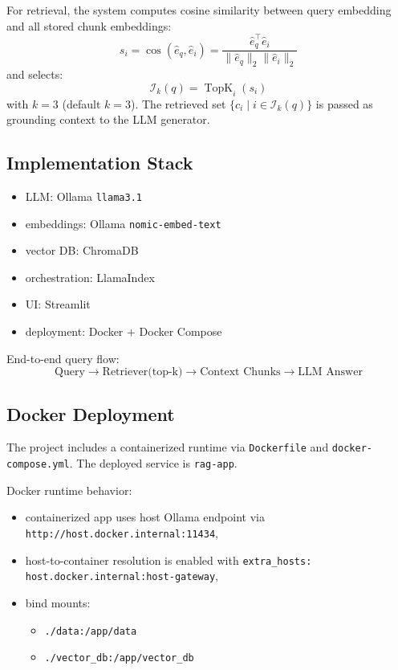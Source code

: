 \documentclass[11pt]{article}
\newcommand{\topK}{3}
\begin{document}
For retrieval, the system computes cosine similarity between query embedding and all stored chunk embeddings:
\[
s_i = \cos(\hat{e}_q, \hat{e}_i) = \frac{\hat{e}_q^\top \hat{e}_i}{\|\hat{e}_q\|_2 \|\hat{e}_i\|_2}
\]
and selects:
\[
\mathcal{I}_k(q) = \operatorname{TopK}_{i}(s_i)
\]
with \(k=\topK\) (default \(k=3\)). The retrieved set \(\{c_i \mid i \in \mathcal{I}_k(q)\}\) is passed as grounding context to the LLM generator.

\subsection{Implementation Stack}
\begin{itemize}
    \item LLM: Ollama \texttt{llama3.1}
    \item embeddings: Ollama \texttt{nomic-embed-text}
    \item vector DB: ChromaDB
    \item orchestration: LlamaIndex
    \item UI: Streamlit
    \item deployment: Docker + Docker Compose
\end{itemize}

End-to-end query flow:
\[
\text{Query} \rightarrow \text{Retriever(top-k)} \rightarrow \text{Context Chunks} \rightarrow \text{LLM Answer}
\]

\subsection{Docker Deployment}
The project includes a containerized runtime via \texttt{Dockerfile} and \texttt{docker-compose.yml}. The deployed service is \texttt{rag-app}.

Docker runtime behavior:
\begin{itemize}
    \item containerized app uses host Ollama endpoint via \texttt{http://host.docker.internal:11434},
    \item host-to-container resolution is enabled with \texttt{extra\_hosts: host.docker.internal:host-gateway},
    \item bind mounts:
    \begin{itemize}
        \item \texttt{./data:/app/data}
        \item \texttt{./vector\_db:/app/vector\_db}
    \end{itemize}
\end{itemize}
\end{document}
